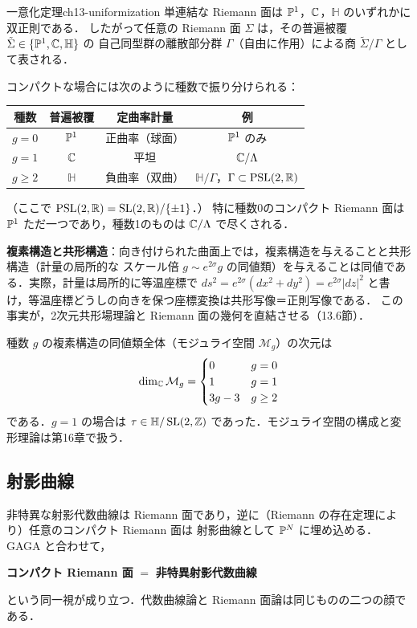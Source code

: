 \begin{mythm}{一意化定理}{ch13-uniformization}
単連結な Riemann 面は $\mathbb{P}^1$，$\mathbb{C}$，$\mathbb{H}$ のいずれかに双正則である．
したがって任意の Riemann 面 $\Sigma$ は，その普遍被覆 $\tilde\Sigma\in\{\mathbb{P}^1,\mathbb{C},\mathbb{H}\}$ の
自己同型群の離散部分群 $\Gamma$（自由に作用）による商 $\tilde\Sigma/\Gamma$ として表される．
\end{mythm}

コンパクトな場合には次のように種数で振り分けられる：
\begin{center}
\begin{tabular}{c|c|c|c}
種数 & 普遍被覆 & 定曲率計量 & 例 \\ \hline
$g=0$ & $\mathbb{P}^1$ & 正曲率（球面） & $\mathbb{P}^1$ のみ \\
$g=1$ & $\mathbb{C}$ & 平坦 & $\mathbb{C}/\Lambda$ \\
$g\geq2$ & $\mathbb{H}$ & 負曲率（双曲） & $\mathbb{H}/\Gamma$，$\Gamma\subset\mathrm{PSL}(2,\mathbb{R})$
\end{tabular}
\end{center}
（ここで $\mathrm{PSL}(2,\mathbb{R})=\operatorname{SL}(2,\mathbb{R})/\{\pm1\}$．）
特に種数0のコンパクト Riemann 面は $\mathbb{P}^1$ ただ一つであり，種数1のものは $\mathbb{C}/\Lambda$ で尽くされる．

\textbf{複素構造と共形構造}：向き付けられた曲面上では，複素構造を与えることと共形構造（計量の局所的な
スケール倍 $g\sim e^{2\sigma}g$ の同値類）を与えることは同値である．実際，計量は局所的に等温座標で
$ds^2 = e^{2\sigma}(dx^2+dy^2)=e^{2\sigma}|dz|^2$ と書け，等温座標どうしの向きを保つ座標変換は共形写像＝正則写像である．
この事実が，2次元共形場理論と Riemann 面の幾何を直結させる（13.6節）．

種数 $g$ の複素構造の同値類全体（モジュライ空間 $\mathcal{M}_g$）の次元は
\begin{equation}
  \dim_{\mathbb{C}} \mathcal{M}_g = \begin{cases} 0 & g=0\\ 1 & g=1\\ 3g-3 & g\geq2\end{cases}
\end{equation}
である．$g=1$ の場合は $\tau\in\mathbb{H}/\operatorname{SL}(2,\mathbb{Z})$ であった．モジュライ空間の構成と変形理論は第16章で扱う．

\subsection{射影曲線}

非特異な射影代数曲線は Riemann 面であり，逆に（Riemann の存在定理により）任意のコンパクト Riemann 面は
射影曲線として $\mathbb{P}^N$ に埋め込める．GAGA と合わせて，
\begin{center}
\textbf{コンパクト Riemann 面} $=$ \textbf{非特異射影代数曲線}
\end{center}
という同一視が成り立つ．代数曲線論と Riemann 面論は同じものの二つの顔である．

